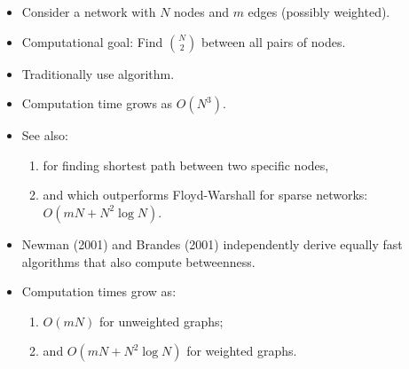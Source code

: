 \begin{frame}

  \begin{itemize}
  \item<1-> 
    Consider a network with $N$ nodes and $m$ edges (possibly weighted).
  \item<2-> 
    \alert{Computational goal:} Find 
    $\binom{N}{2}$
     between all pairs of nodes.
  \item<3-> 
    Traditionally use  algorithm.
  \item<4-> 
    Computation time grows as $O (N^3)$.
  \item<5->
    See also: 
    \begin{enumerate}
    \item<5-> 
       for finding shortest path between two specific nodes,
    \item<6-> 
      and  which outperforms Floyd-Warshall for sparse networks:
      $O (mN + N^2 \log N)$.
    \end{enumerate}
  \item<7-> 
    Newman (2001)\cite{newman2001d,newman2004b} and Brandes (2001)\cite{brandes2001a} 
    independently derive equally fast algorithms that also compute betweenness.
  \item<8->Computation times grow as:
      \begin{enumerate}
      \item<9-> $O (mN)$ for unweighted graphs;
      \item<10-> and $O (mN + N^2 \log N)$ for weighted graphs.
      \end{enumerate}
  \end{itemize}

\end{frame}

